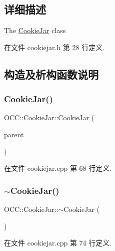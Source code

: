 \subsection{详细描述}
The \hyperlink{class_o_c_c_1_1_cookie_jar}{Cookie\+Jar} class 

在文件 cookiejar.\+h 第 28 行定义.



\subsection{构造及析构函数说明}
\mbox{\label{class_o_c_c_1_1_cookie_jar_ac0ec7f67133657b68d5c16419a33c7f9}} 
\subsubsection{\texorpdfstring{Cookie\+Jar()}{CookieJar()}}
{\footnotesize\ttfamily O\+C\+C\+::\+Cookie\+Jar\+::\+Cookie\+Jar (\begin{DoxyParamCaption}\item[{Q\+Object $\ast$}]{parent = {} }\end{DoxyParamCaption})\hspace{0.3cm}{\ttfamily [explicit]}}



在文件 cookiejar.\+cpp 第 68 行定义.

\mbox{\label{class_o_c_c_1_1_cookie_jar_a25624760d827c28880b7ff4cf9adab78}} 
\subsubsection{\texorpdfstring{$\sim$\+Cookie\+Jar()}{~CookieJar()}}
{\footnotesize\ttfamily O\+C\+C\+::\+Cookie\+Jar\+::$\sim$\+Cookie\+Jar (\begin{DoxyParamCaption}{ }\end{DoxyParamCaption})}



在文件 cookiejar.\+cpp 第 74 行定义.



